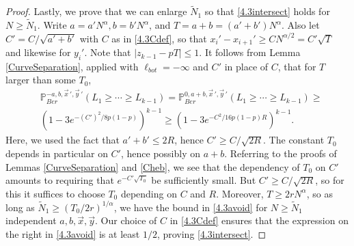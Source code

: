\begin{proof}
		Lastly, we prove that we can enlarge $\tilde{N}_1$ so that \eqref{4.3intersect} holds for $N\geq\tilde{N}_1$. Write $a = a'N^\alpha, b = b'N^\alpha$, and $T = a+b = (a'+b')N^\alpha$. Also let $C' = C/\sqrt{a'+b'}$ with $C$ as in \eqref{4.3Cdef}, so that $x_i' - x_{i+1}' \geq CN^{\alpha/2} = C'\sqrt{T}$ and likewise for $y_i'$. Note that $|z_{k-1}-pT| \leq 1$. It follows from Lemma \ref{CurveSeparation}, applied with $\ell_{bot} = -\infty$ and $C'$ in place of $C$, that for $T$ larger than some $T_0$, 
		\begin{equation}\label{4.3avoid}
		\begin{split}
		& \mathbb{P}^{-a, b, \vec{x}\,', \vec{y}\,'}_{Ber}(L_1 \geq \cdots \geq L_{k-1}) = \mathbb{P}^{0, a+b, \vec{x}\,', \vec{y}\,'}_{Ber}(L_1 \geq \cdots \geq L_{k-1}) \geq\\ & \left(1 - 3e^{-(C')^2/8p(1-p)}\right)^{k-1} \geq \left(1 - 3e^{-C^2/16p(1-p)R}\right)^{k-1}.
		\end{split}
		\end{equation}
		Here, we used the fact that $a'+b' \leq 2R$, hence $C' \geq C/\sqrt{2R}$. The constant $T_0$ depends in particular on $C'$, hence possibly on $a+b$. Referring to the proofs of Lemmas \ref{CurveSeparation} and \ref{Cheb}, we see that the dependency of $T_0$ on $C'$ amounts to requiring that $e^{-C'\sqrt{T_0}}$ be sufficiently small. But $C' \geq C/\sqrt{2R}$, so for this it suffices to choose $T_0$ depending on $C$ and $R$. Moreover, $T\geq 2rN^\alpha$, so as long as $\tilde{N}_1 \geq (T_0/2r)^{1/\alpha}$, we have the bound in \eqref{4.3avoid} for $N\geq\tilde{N}_1$ independent $a,b,\vec{x},\vec{y}$. Our choice of $C$ in \eqref{4.3Cdef} ensures that the expression on the right in \eqref{4.3avoid} is at least $1/2$, proving \eqref{4.3intersect}.
		
	\end{proof}
	
	
	

		
	
	
